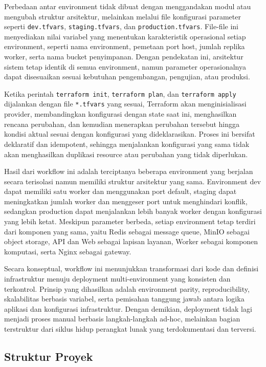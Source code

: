 Perbedaan antar environment tidak dibuat dengan menggandakan modul atau mengubah struktur arsitektur, melainkan melalui file konfigurasi parameter seperti \texttt{dev.tfvars}, \texttt{staging.tfvars}, dan \texttt{production.tfvars}. File-file ini menyediakan nilai variabel yang menentukan karakteristik operasional setiap environment, seperti nama environment, pemetaan port host, jumlah replika worker, serta nama bucket penyimpanan. Dengan pendekatan ini, arsitektur sistem tetap identik di semua environment, namun parameter operasionalnya dapat disesuaikan sesuai kebutuhan pengembangan, pengujian, atau produksi.

Ketika perintah \texttt{terraform init}, \texttt{terraform plan}, dan \texttt{terraform apply} dijalankan dengan file \texttt{*.tfvars} yang sesuai, Terraform akan menginisialisasi provider, membandingkan konfigurasi dengan state saat ini, menghasilkan rencana perubahan, dan kemudian menerapkan perubahan tersebut hingga kondisi aktual sesuai dengan konfigurasi yang dideklarasikan. Proses ini bersifat deklaratif dan idempotent, sehingga menjalankan konfigurasi yang sama tidak akan menghasilkan duplikasi resource atau perubahan yang tidak diperlukan.

Hasil dari workflow ini adalah terciptanya beberapa environment yang berjalan secara terisolasi namun memiliki struktur arsitektur yang sama. Environment dev dapat memiliki satu worker dan menggunakan port default, staging dapat meningkatkan jumlah worker dan menggeser port untuk menghindari konflik, sedangkan production dapat menjalankan lebih banyak worker dengan konfigurasi yang lebih ketat. Meskipun parameter berbeda, setiap environment tetap terdiri dari komponen yang sama, yaitu Redis sebagai message queue, MinIO sebagai object storage, API dan Web sebagai lapisan layanan, Worker sebagai komponen komputasi, serta Nginx sebagai gateway.

Secara konseptual, workflow ini menunjukkan transformasi dari kode dan definisi infrastruktur menuju deployment multi-environment yang konsisten dan terkontrol. Prinsip yang dihasilkan adalah environment parity, reproducibility, skalabilitas berbasis variabel, serta pemisahan tanggung jawab antara logika aplikasi dan konfigurasi infrastruktur. Dengan demikian, deployment tidak lagi menjadi proses manual berbasis langkah-langkah ad-hoc, melainkan bagian terstruktur dari siklus hidup perangkat lunak yang terdokumentasi dan terversi.




\subsection{Struktur Proyek}

